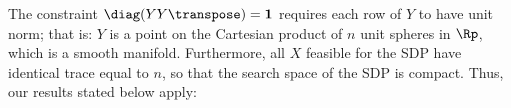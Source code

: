 \documentclass{article}
\newcommand{\1}{\mathbf{1}}
\begin{document}

The constraint $\diag(YY\transpose)=\1$ requires each row of $Y$ to have unit norm; that is: $Y$ is a point on the Cartesian product of $n$ unit spheres in $\Rp$, which is a smooth manifold. Furthermore, all $X$ feasible for the SDP have identical trace equal to $n$, so that the search space of the SDP is compact. Thus, our results stated below apply:
\end{document}
